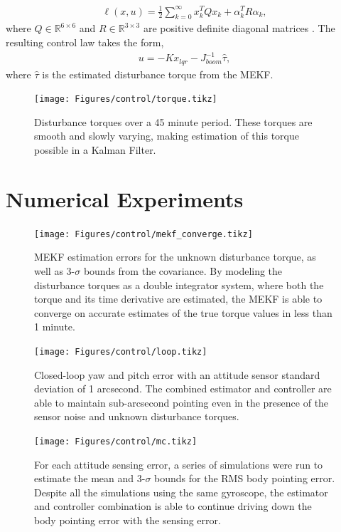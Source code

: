 \begin{align}
\ell(x,u) = \frac{1}{2}\sum_{k=0}^\infty x_{k}^TQx_{k} + \alpha_k^TR\alpha_k , 
\end{align}
where $Q\in {\mathbb{R}}^{6 \times 6}$ and $R\in {\mathbb{R}}^{3\times 3}$ are positive definite diagonal matrices \cite{stengel1994}. The resulting control law takes the form,
\begin{align}
    u = -Kx_{lqr} - J_{boom}^{-1}\hat{\tau},
\end{align}
where $\hat{\tau}$ is the estimated disturbance torque from the MEKF.
\begin{figure}
    \centering
    \texttt{[image: Figures/control/torque.tikz]}
    \caption{Disturbance torques over a 45 minute period. These torques are smooth and slowly varying, making estimation of this torque possible in a Kalman Filter.}
    \label{fig:torque}
\end{figure}
\section{Numerical Experiments}
\label{sec:wigglesat:experiments}
\begin{figure}
    \centering
    \texttt{[image: Figures/control/mekf\_converge.tikz]}
    \caption{MEKF estimation errors for the unknown disturbance torque, as well as 3-$\sigma$ bounds from the covariance. By modeling the disturbance torques as a double integrator system, where both the torque and its time derivative are estimated, the MEKF is able to converge on accurate estimates of the true torque values in less than 1 minute.}
    \label{fig:mekf}
\end{figure}
\begin{figure}
    \centering
    \texttt{[image: Figures/control/loop.tikz]}
    \caption{Closed-loop yaw and pitch error with an attitude sensor standard deviation of 1 arcsecond. The combined estimator and controller are able to maintain sub-arcsecond pointing even in the presence of the sensor noise and unknown disturbance torques.}
    \label{fig:loop}
\end{figure}
\begin{figure}
    \centering
    \texttt{[image: Figures/control/mc.tikz]}
    \caption{For each attitude sensing error, a series of simulations were run to estimate the mean and 3-$\sigma$ bounds for the RMS body pointing error. Despite all the simulations using the same gyroscope, the estimator and controller combination is able to continue driving down the body pointing error with the sensing error.}
    \label{fig:mc}
\end{figure}

